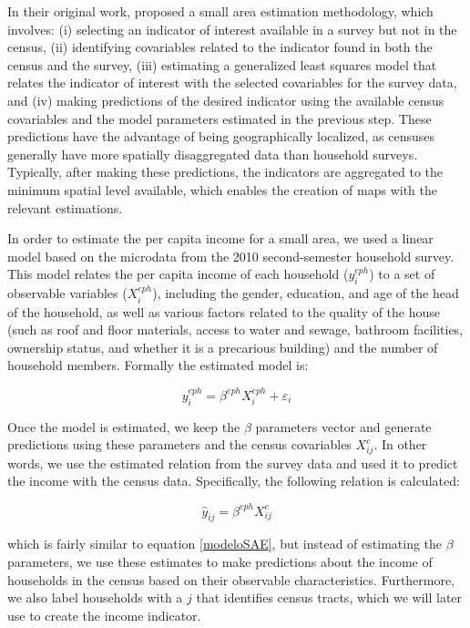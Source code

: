 \documentclass[conference]{IEEEtran}
\begin{document}
In their original work, \citep{Elbers2003} proposed a small area estimation methodology, which involves: (i) selecting an indicator of interest available in a survey but not in the census, (ii) identifying covariables related to the indicator found in both the census and the survey, (iii) estimating a generalized least squares model that relates the indicator of interest with the selected covariables for the survey data, and (iv) making predictions of the desired indicator using the available census covariables and the model parameters estimated in the previous step. These predictions have the advantage of being geographically localized, as censuses generally have more spatially disaggregated data than household surveys. Typically, after making these predictions, the indicators are aggregated to the minimum spatial level available, which enables the creation of maps with the relevant estimations.

In order to estimate the per capita income for a small area, we used a linear model based on the microdata from the 2010 second-semester household survey. This model relates the per capita income of each household ($y^{eph}_{i}$) to a set of observable variables ($X^{eph}_{i}$), including the gender, education, and age of the head of the household, as well as various factors related to the quality of the house (such as roof and floor materials, access to water and sewage, bathroom facilities, ownership status, and whether it is a precarious building) and the number of household members. Formally the estimated model is:

\begin{equation} \label{modeloSAE}
    y^{eph}_{i}= \beta^{eph} X^{eph}_{i} + \varepsilon_{i}
\end{equation}

Once the model is estimated, we keep the $\beta$ parameters vector and generate predictions using these parameters and the census covariables $X^{c}_{ij}$. In other words, we use the estimated relation from the survey data and used it to predict the income with the census data. Specifically, the following relation is calculated:

\begin{equation} \label{predict}
    \hat{y}_{ij}= \beta^{eph} X^{c}_{ij}
\end{equation}

which is fairly similar to equation \ref{modeloSAE}, but instead of estimating the $\beta$ parameters, we use these estimates to make predictions about the income of households in the census based on their observable characteristics. Furthermore, we also label households with a $j$ that identifies census tracts, which we will later use to create the income indicator.
\end{document}
